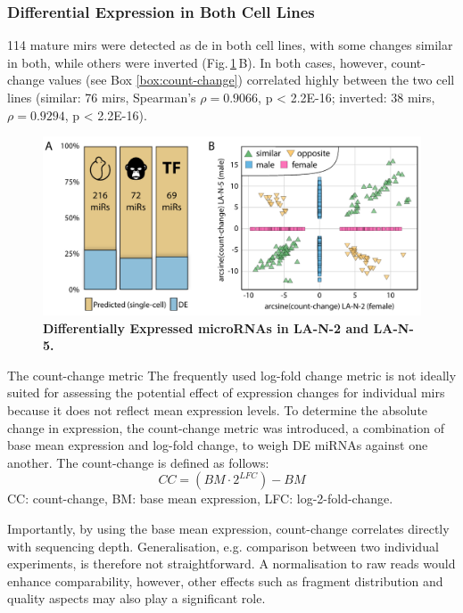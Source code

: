 \subsubsection{Differential Expression in Both Cell Lines}


114 mature \acp{mir} were detected as \ac{de} in both cell lines, with some changes similar in both, while others were inverted (Fig.\,\ref{fig:cc-cor-de-perm}\,B). In both cases, however, count-change values (see Box \ref{box:count-change}) correlated highly between the two cell lines (similar: 76 \acp{mir}, Spearman’s $\rho = 0.9066$, p < 2.2E-16; inverted: 38 \acp{mir}, $\rho = 0.9294$, p < 2.2E-16).

\begin{figure}[ht]
\centering
\includegraphics[width=\textwidth]{figures/cc-cor-de-perm}
\caption[Differentially Expressed microRNAs in LA-N-2 and LA-N-5.]{\textbf{Differentially Expressed microRNAs in LA-N-2 and LA-N-5.}
\label{fig:cc-cor-de-perm}}
\end{figure}

\begin{mybox}{The count-change metric}\label{box:count-change}
The frequently used log-fold change metric is not ideally suited for assessing the potential effect of expression changes for individual \acp{mir} because it does not reflect mean expression levels. To determine the absolute change in expression, the count-change metric was introduced, a combination of base mean expression and log-fold change, to weigh DE miRNAs against one another. The count-change is defined as follows: $$CC = (BM \cdot 2^{LFC}) - BM$$
CC: count-change, BM: base mean expression, LFC: log-2-fold-change.

Importantly, by using the base mean expression, count-change correlates directly with sequencing depth. Generalisation, e.g. comparison between two individual experiments, is therefore not straightforward. A normalisation to raw reads would enhance comparability, however, other effects such as fragment distribution and quality aspects may also play a significant role.
\end{mybox}

